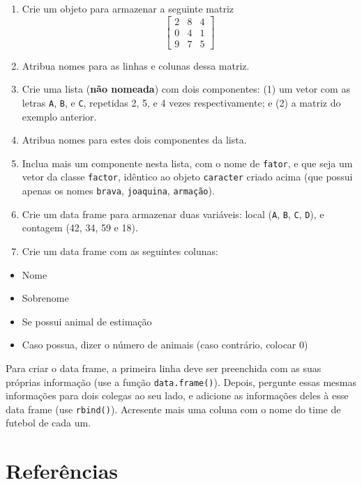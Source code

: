 \documentclass[10pt,a4paper]{book}
\providecommand{\tightlist}{%
  \setlength{\itemsep}{0pt}\setlength{\parskip}{0pt}}
\begin{document}
\begin{enumerate}
\def\labelenumi{\arabic{enumi}.}
\tightlist
\item
  Crie um objeto para armazenar a seguinte matriz
  \[\left[ \begin{array}{ccc}
          2 & 8 & 4 \\
          0 & 4 & 1 \\
          9 & 7 & 5
          \end{array} \right]\]
\item
  Atribua nomes para as linhas e colunas dessa matriz.
\item
  Crie uma lista (\textbf{não nomeada}) com dois componentes: (1) um
  vetor com as letras \texttt{A}, \texttt{B}, e \texttt{C}, repetidas 2,
  5, e 4 vezes respectivamente; e (2) a matriz do exemplo anterior.
\item
  Atribua nomes para estes dois componentes da lista.
\item
  Inclua mais um componente nesta lista, com o nome de \texttt{fator}, e
  que seja um vetor da classe \texttt{factor}, idêntico ao objeto
  \texttt{caracter} criado acima (que possui apenas os nomes
  \texttt{brava}, \texttt{joaquina}, \texttt{armação}).
\item
  Crie um data frame para armazenar duas variáveis: local (\texttt{A},
  \texttt{B}, \texttt{C}, \texttt{D}), e contagem (42, 34, 59 e 18).
\item
  Crie um data frame com as seguintes colunas:
\end{enumerate}

\begin{itemize}
\tightlist
\item
  Nome
\item
  Sobrenome
\item
  Se possui animal de estimação
\item
  Caso possua, dizer o número de animais (caso contrário, colocar 0)
\end{itemize}

Para criar o data frame, a primeira linha deve ser preenchida com as
suas próprias informação (use a função \texttt{data.frame()}). Depois,
pergunte essas mesmas informações para dois colegas ao seu lado, e
adicione as informações deles à esse data frame (use \texttt{rbind()}).
Acresente mais uma coluna com o nome do time de futebol de cada um.

\section*{Referências}\label{referuxeancias-1}
\end{document}
